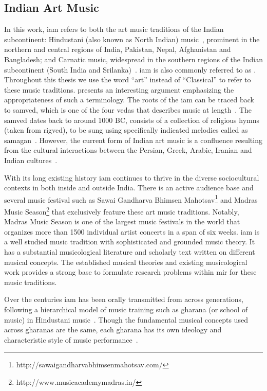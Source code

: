 \subsection{Indian Art Music}
\label{sec:music_background_iam}

In this work, \acrfull{iam} refers to both the art music traditions of the Indian subcontinent: Hindustani (also known as North Indian) music~\cite{Bor2010, Danielou2010}, prominent in the northern and central regions of India, Pakistan, Nepal, Afghanistan and Bangladesh; and Carnatic music, widespread in the southern regions of the Indian subcontinent (South India and Srilanka)~\cite{Singh1995,Viswanathan2004}. \gls{iam} is also commonly referred to as . Throughout this thesis we use the word ``art'' instead of ``Classical'' to refer to these music traditions. \cite[Page 1]{Raja2012} presents an interesting argument emphasizing the appropriateness of such a terminology. The roots of the \gls{iam} can be traced back to \gls{samved}, which is one of the four \gls{vedas} that describes music at length~\cite{Trivedi2008,Singh1995}. The \gls{samved} dates back to around 1000 BC, consists of a collection of religious hymns (taken from \gls{rigved}), to be sung using specifically indicated melodies called as \gls{samagan}~\cite{Griffith2004}. However, the current form of Indian art music is a confluence resulting from the cultural interactions between the Persian, Greek, Arabic, Iranian and Indian cultures~\cite{Kaul2007,Saraf2011,Singh1995}.

With its long existing history \gls{iam} continues to thrive in the diverse sociocultural contexts in both inside and outside India. There is an active audience base and several music festival such as Sawai Gandharva Bhimsen Mahotsav\footnote{http://sawaigandharvabhimsenmahotsav.com/} and Madras Music Season\footnote{http://www.musicacademymadras.in/} that exclusively feature these art music traditions. Notably, Madras Music Season is one of the largest music festivals in the world that organizes more than 1500 individual artist concerts in a span of six weeks. \Gls{iam} is a well studied music tradition with sophisticated and grounded music theory. It has a substantial musicological literature and scholarly text written on different musical concepts. The established musical theories and existing musicological work provides a strong base to formulate research problems within \gls{mir} for these music traditions. 

Over the centuries \gls{iam} has been orally transmitted from across generations, following a hierarchical model of music training such as \gls{gharana} (or school of music) in Hindustani music~\cite{Saraf2011,Mehta2008}. Though the fundamental musical concepts used across \glspl{gharana} are the same, each \gls{gharana} has its own ideology and characteristic style of music performance~\cite{Deshpande1989}.

